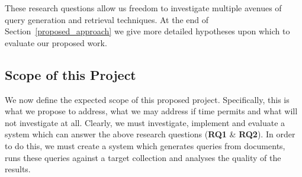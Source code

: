 \documentclass{mprop}
\begin{document}
These research questions allow us freedom to investigate multiple avenues of query generation and retrieval techniques. At the end of Section~\ref{proposed_approach} we give more detailed hypotheses upon which to evaluate our proposed work.


\subsection{Scope of this Project}
We now define the expected scope of this proposed project. Specifically, this is what we propose to address, what we may address if time permits and what will not investigate at all.
Clearly, we must investigate, implement and evaluate a system which can answer the above research questions (\textbf{RQ1} \& \textbf{RQ2}). 
In order to do this, we must create a system which generates queries from documents, runs these queries against a target collection and analyses the quality of the results.
\end{document}
